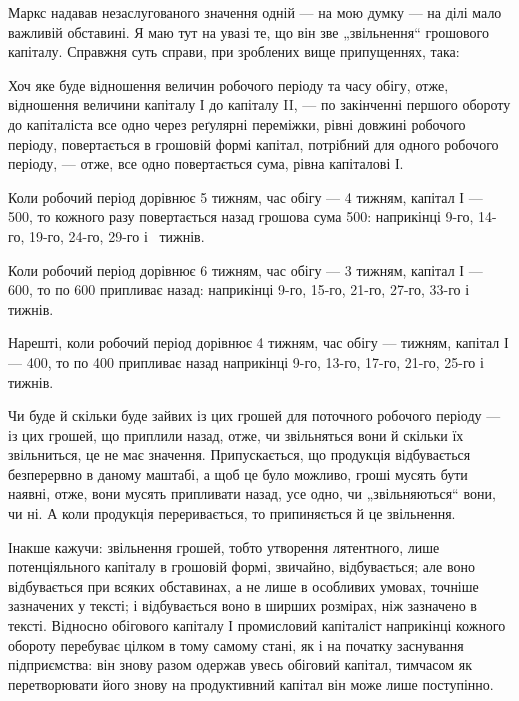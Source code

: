 \parcont{}  %
Маркс надавав незаслугованого значення одній — на мою думку — на ділі
мало важливій обставині. Я маю тут на увазі те, що він зве „звільнення“
грошового капіталу. Справжня суть справи, при зроблених вище припущеннях,
така:

Хоч яке буде відношення величин робочого періоду та часу обігу,
отже, відношення величини капіталу І до капіталу II, — по закінченні першого
обороту до капіталіста все одно через реґулярні переміжки, рівні
довжині робочого періоду, повертається в грошовій формі капітал, потрібний
для одного робочого періоду, — отже, все одно повертається сума,
рівна капіталові І.

Коли робочий період дорівнює 5 тижням, час обігу — 4 тижням, капітал
І — 500, то кожного разу повертається назад грошова
сума 500: наприкінці 9-го, 14-го, 19-го, 24-го, 29-го і~
тижнів.

Коли робочий період дорівнює 6 тижням, час обігу — 3 тижням, капітал
І — 600, то по 600 припливає назад: наприкінці
9-го, 15-го, 21-го, 27-го, 33-го і~ тижнів.

Нарешті, коли робочий період дорівнює 4 тижням, час обігу — тижням,
капітал І — 400, то по 400 припливає назад наприкінці
9-го, 13-го, 17-го, 21-го, 25-го і~ тижнів.

Чи буде й скільки буде зайвих із цих грошей для поточного робочого
періоду — із цих грошей, що приплили назад, отже, чи звільняться
вони й скільки їх звільниться, це не має значення. Припускається, що
продукція відбувається безперервно в даному маштабі, а щоб це було
можливо, гроші мусять бути наявні, отже, вони мусять припливати назад,
усе одно, чи „звільняються“ вони, чи ні. А коли продукція переривається,
то припиняється й це звільнення.

Інакше кажучи: звільнення грошей, тобто утворення лятентного, лише
потенціяльного капіталу в грошовій формі, звичайно, відбувається;
але воно відбувається при всяких обставинах, а не лише в особливих умовах,
точніше зазначених у тексті; і відбувається воно в ширших розмірах,
ніж зазначено в тексті. Відносно обігового капіталу І промисловий капіталіст
наприкінці кожного обороту перебуває цілком в тому самому
стані, як і на початку заснування підприємства: він знову разом одержав
увесь обіговий капітал, тимчасом як перетворювати його знову на продуктивний
капітал він може лише поступінно.

